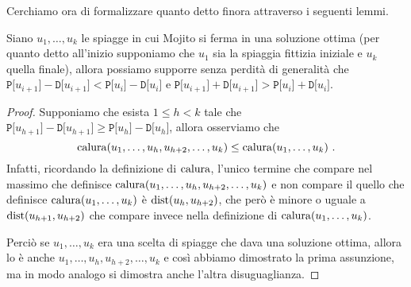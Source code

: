 Cerchiamo ora di formalizzare quanto detto finora attraverso i seguenti lemmi.

\begin{lemma}
	Siano $u_1,\ldots,u_k$ le spiagge in cui Mojito si ferma in una soluzione ottima (per quanto detto all'inizio supponiamo che $u_1$ sia la spiaggia fittizia iniziale e $u_k$ quella finale), allora possiamo supporre senza perdità di generalità che $\texttt{P[}u_{i+1} \texttt{]} - \texttt{D[}u_{i+1}\texttt{]} < \texttt{P[}u_i \texttt{]} - \texttt{D[}u_i\texttt{]}$ e $\texttt{P[}u_{i+1} \texttt{]} + \texttt{D[}u_{i+1}\texttt{]} > \texttt{P[}u_i \texttt{]} + \texttt{D[}u_i\texttt{]}$.
\end{lemma}
\begin{small}
\begin{proof}
	Supponiamo che esista $1\le h < k$ tale che $\texttt{P[}u_{h+1} \texttt{]} - \texttt{D[}u_{h+1}\texttt{]} \ge \texttt{P[}u_h \texttt{]} - \texttt{D[}u_h\texttt{]}$, allora osserviamo che 
	\begin{equation*}
		\mathrm{calura}(u_1,\ldots, u_h, u_{h+2}, \ldots, u_k) \le \mathrm{calura}(u_1, \ldots, u_k) \ .
	\end{equation*}
	Infatti, ricordando la definizione di $\mathrm{calura}$, l'unico termine che compare nel massimo che definisce $\mathrm{calura}(u_1,\ldots, u_h, u_{h+2}, \ldots, u_k)$ e non compare il quello che definisce $\mathrm{calura}(u_1, \ldots, u_k)$ è $\mathrm{dist}(u_h, u_{h+2})$, che però è minore o uguale a $\mathrm{dist}(u_{h+1},u_{h+2})$ che compare invece nella definizione di $\mathrm{calura}(u_1, \ldots, u_k)$.
	
	Perciò se $u_1,\ldots,u_k$ era una scelta di spiagge che dava una soluzione ottima, allora lo è anche $u_1,\ldots,u_h,u_{h+2},\ldots, u_k$ e così abbiamo dimostrato la prima assunzione, ma in modo analogo si dimostra anche l'altra disuguaglianza.
\end{proof}
\end{small}

